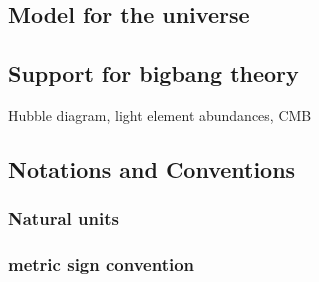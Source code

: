 \documentclass[12pt,a4paper,oneside]{book}
\begin{document}
\subsection{Model for the universe}
\subsection{Support for bigbang theory}
Hubble diagram, light element abundances, CMB
\subsection{Notations and Conventions}
\subsubsection{Natural units}
\subsubsection{ metric sign convention}
\end{document}
